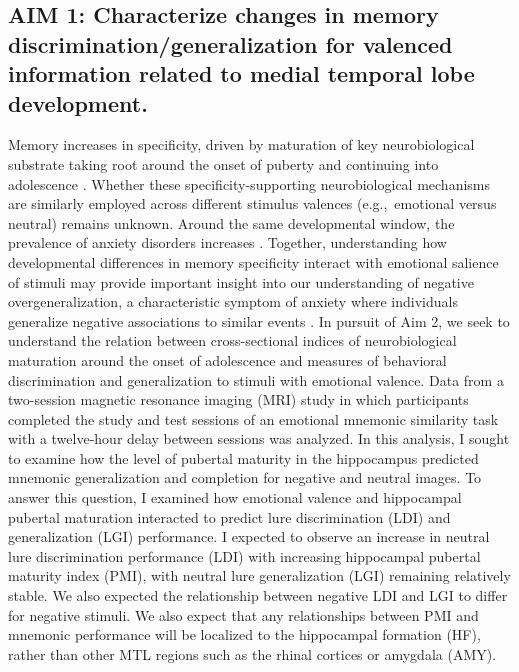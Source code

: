 \documentclass[11pt]{article}
\providecommand\citep{\cite}
\begin{document}
\subsection*{AIM 1: Characterize changes in memory discrimination/generalization for valenced information
    related to medial temporal lobe development.}
Memory increases in specificity, driven by maturation of key neurobiological substrate
taking root around the onset of puberty and continuing into adolescence
\citep{Lavenex2007, Lee2014,Daugherty2017,Keresztes2018}. Whether these
specificity-supporting neurobiological mechanisms are similarly employed across
different stimulus valences (e.g.,\ emotional versus neutral) remains unknown. Around
the same developmental window, the prevalence of anxiety disorders increases
\citep{Beesdo2009}. Together, understanding how developmental differences in memory
specificity interact with emotional salience of stimuli may provide important insight
into our understanding of negative overgeneralization, a characteristic symptom of
anxiety where individuals generalize negative associations to similar events
\citep{Lissek2014}. In pursuit of Aim 2, we seek to understand the relation between
cross-sectional indices of neurobiological maturation around the onset of adolescence
and measures of behavioral discrimination and generalization to stimuli with emotional
valence. Data from a two-session magnetic resonance imaging (MRI) study in which participants completed
the study and test sessions of an emotional mnemonic similarity task with a twelve-hour
delay between sessions was analyzed. In this analysis, I sought to examine how the level of pubertal
maturity in the hippocampus predicted mnemonic generalization and completion for
negative and neutral images. To answer this question, I examined how emotional valence
and hippocampal pubertal maturation interacted to predict lure discrimination (LDI) and
generalization (LGI) performance. I expected to observe an increase in neutral lure
discrimination performance (LDI) with increasing hippocampal pubertal maturity index
(PMI), with neutral lure generalization (LGI) remaining relatively stable. We also
expected the relationship between negative LDI and LGI to differ for negative stimuli.
We also expect that any relationships between PMI and mnemonic performance will be
localized to the hippocampal formation (HF), rather than other MTL regions such as the
rhinal cortices or amygdala (AMY).
\end{document}
